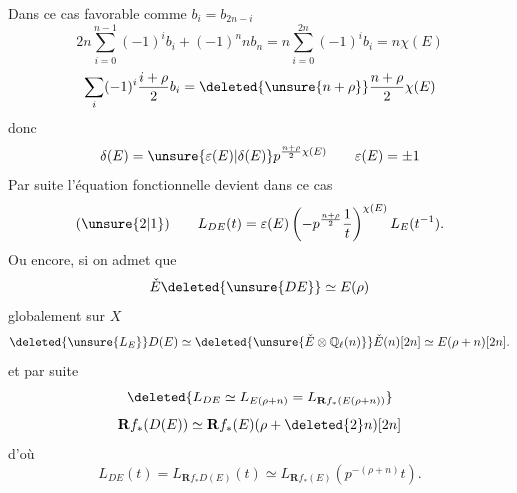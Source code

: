 Dans ce cas favorable
comme $b_i=b_{2n-i}$
\[
2n\sum_{i=0}^{n-1}(-1)^i b_i+(-1)^n n b_n=n\sum_{i=0}^{2n}(-1)^i b_i=n\chi(E)
\]
\[
\sum_i(-1)^i\frac{i+\rho}{2}b_i=\deleted{\unsure{n+\rho}}\frac{n+\rho}{2}\chi(E)
\]
donc
\[
\delta(E)=\unsure{\varepsilon(E)|\delta(E)}p^{\frac{n+\rho}{2}\chi(E)}
\qquad\varepsilon(E)=\pm1
\]
Par suite l'équation fonctionnelle devient dans ce cas
\[
(\unsure{2|1})\qquad L_{DE}(t)=\varepsilon(E)\left(-p^{\frac{n+\rho}{2}}\frac1t\right)^{\chi(E)}L_E(t^{-1}).
\]
Ou encore, si on admet que
\[
\check E\deleted{\unsure{DE}}\simeq E(\rho)
\]
globalement sur $X$ 
\[
\deleted{\unsure{L_E}}D(E)\simeq\deleted{\unsure{\check E\otimes\mathbb Q_\ell(n)}}\check E(n)[2n]\simeq E(\rho+n)[2n].
\]
et par suite
\[
\deleted{L_{DE}\simeq L_{E(\rho+n)}=L_{\mathbf R f_*(E(\rho+n))}}
\]
\[
\mathbf R f_*(D(E))\simeq\mathbf R f_*(E)(\rho+\deleted{2}n)[2n]
\]
d'où
\[
L_{DE}(t)=L_{\mathbf R f_*D(E)}(t)\simeq L_{\mathbf R f_*(E)}\left(p^{-(\rho+n)}t\right).
\]
